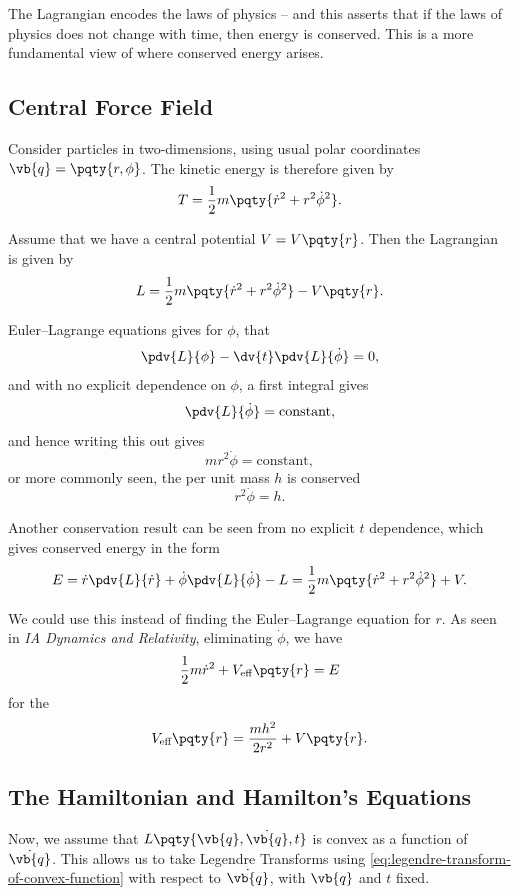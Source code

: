 The Lagrangian encodes the laws of physics -- and this asserts that if the laws of physics does not change with time, then energy is conserved. This is a more fundamental view of where conserved energy arises.

\subsection{Central Force Field}

Consider particles in two-dimensions, using usual polar coordinates \(\vb{q} = \pqty{r, \phi}\). The kinetic energy is therefore given by
\[
    T = \frac{1}{2} m \pqty{\dot{r}^2 + r^2 \dot{\phi}^2}.
\]

Assume that we have a central potential \(V = V\pqty{r}\). Then the Lagrangian is given by
\[
    L = \frac{1}{2} m \pqty{\dot{r}^2 + r^2 \dot{\phi}^2} - V\pqty{r}.
\]

\begin{example}
    Euler--Lagrange equations gives for \(\phi\), that
    \[
        \pdv{L}{\phi} - \dv{t} \pdv{L}{\dot{\phi}} = 0,
    \]
    and with no explicit dependence on \(\phi\), a first integral gives
    \[
        \pdv{L}{\dot{\phi}} = \text{constant},
    \]
    and hence writing this out gives
    \[
        m r^2 \dot{\phi} = \text{constant},
    \]
    or more commonly seen, the  per unit mass \(h\) is conserved
    \[
        r^2 \dot{\phi} = h.
    \]
\end{example}

Another conservation result can be seen from no explicit \(t\) dependence, which gives conserved energy in the form
\[
    E = \dot{r} \pdv{L}{\dot{r}} + \dot{\phi} \pdv{L}{\dot{\phi}} - L = \frac{1}{2} m \pqty{\dot{r}^2 + r^2 \dot{\phi}^2} + V.
\]

We could use this instead of finding the Euler--Lagrange equation for \(r\). As seen in \textit{IA Dynamics and Relativity}, eliminating \(\dot{\phi}\), we have
\[
    \frac{1}{2} m \dot{r}^2 + V_{\text{eff}} \pqty{r} = E
\]
for the 
\[
    V_{\text{eff}} \pqty{r} = \frac{m h^2}{2 r^2} + V\pqty{r}.
\]

\subsection{The Hamiltonian and Hamilton's Equations}

Now, we assume that \(L\pqty{\vb{q}, \dot{\vb{q}}, t}\) is convex as a function of \(\dot{\vb{q}}\). This allows us to take Legendre Transforms using \eqref{eq:legendre-transform-of-convex-function} with respect to \(\dot{\vb{q}}\), with \(\vb{q}\) and \(t\) fixed.

